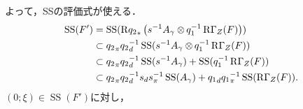 \documentclass[leqno, 10pt, a4paper, dvipdfmx]{jsarticle}
\makeatletter
\theoremstyle{definition}
\renewenvironment{proof}[1][\proofname]{\par
  \pushQED{\qed}%
  \normalfont \topsep6\p@\@plus6\p@\relax
  \trivlist
  \item[\hskip\labelsep
         \bfseries
    {#1}]\ignorespaces
}{%
  \popQED\endtrivlist\@endpefalse
}
\renewcommand{\proofname}{証明.}
\numberwithin{equation}{section}
\newcommand{\muS}{\mathop{\mathrm{SS}}\nolimits}
\newcommand{\RG}{\mathop{\mathrm{R}\hspace{-0pt}\Gamma}\nolimits}
\newcommand{\Rder}{\mathrm{R}}
\newcommand{\tens}[1][]{\mathbin{\otimes_{\raise1.5ex\hbox to-.1em{}{#1}}}}
\theoremstyle{mystyle}
\newcommand{\mpb}[1][]{{#1}_{\pi}} %
\newcommand{\mdiff}[1][]{{#1}_{d}} %
\makeatother
\begin{document}
\begin{proof}
    よって，SSの評価式が使える．
    \begin{align*}
        \muS(F')&=\muS(
        \Rder{{q_2}_{\ast}}\left(s^{-1}A_{\gamma}\tens[]q_1^{-1}\RG_Z(F)\right)
        )\\
        &\subset
        \mpb[q_2]\mdiff[q_2]^{-1}\muS(s^{-1}A_{\gamma}\tens[]q_1^{-1}\RG_Z(F))\\
        &\subset
        \mpb[q_2]\mdiff[q_2]^{-1}\muS(s^{-1}A_{\gamma})+\muS(q_1^{-1}\RG_Z(F))\\
        &\subset
        \mpb[q_2]\mdiff[q_2]^{-1}\mdiff[s]\mpb[s]^{-1}\muS(A_{\gamma})+\mdiff[q_1]\mpb[q_1]^{-1}\muS(\RG_Z(F)).
    \end{align*}
    \((0;\xi)\in\muS(F')\)に対し，
\end{proof}





















\clearpage
\appendix
\end{document}

